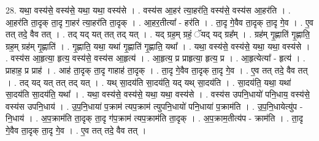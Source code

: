 \documentclass[17pt]{extarticle}
\begin{document}
28. यथा॒ वस्य॑से॒ वस्य॑से॒ यथा॒ यथा॒ वस्य॑से । . वस्य॑स आ॒हर॑ त्या॒हर॑ति॒ वस्य॑से॒ वस्य॑स आ॒हर॑ति । . आ॒हर॑ति ता॒दृक् ता॒दृ गा॒हर॑ त्या॒हर॑ति ता॒दृक् । . आ॒हर॒तीत्या᳚ - हर॑ति । . ता॒दृ गे॒वैव ता॒दृक् ता॒दृ गे॒व । . ए॒व तत् तदे॒ वैव तत् । . तद् यद् यत् तत् तद् यत् । . यद् ग्रह॒म् ग्रहं॒ ॅयद् यद् ग्रह᳚म् । . ग्रह॑म् गृ॒ह्णाति॑ गृ॒ह्णाति॒ ग्रह॒म् ग्रह॑म् गृ॒ह्णाति॑ । . गृ॒ह्णाति॒ यथा॒ यथा॑ गृ॒ह्णाति॑ गृ॒ह्णाति॒ यथा᳚ । . यथा॒ वस्य॑से॒ वस्य॑से॒ यथा॒ यथा॒ वस्य॑से । . वस्य॑स आ॒हृत्या॒ हृत्य॒ वस्य॑से॒ वस्य॑स आ॒हृत्य॑ । . आ॒हृत्य॒ प्र प्राहृत्या॒ हृत्य॒ प्र । . आ॒हृत्येत्या᳚ - हृत्य॑ । . प्राहाह॒ प्र प्राह॑ । . आह॑ ता॒दृक् ता॒दृ गाहाह॑ ता॒दृक् । . ता॒दृ गे॒वैव ता॒दृक् ता॒दृ गे॒व । . ए॒व तत् तदे॒ वैव तत् । . तद् यद् यत् तत् तद् यत् । . यथ् सा॒दय॑ति सा॒दय॑ति॒ यद् यथ् सा॒दय॑ति । . सा॒दय॑ति॒ यथा॒ यथा॑ सा॒दय॑ति सा॒दय॑ति॒ यथा᳚ । . यथा॒ वस्य॑से॒ वस्य॑से॒ यथा॒ यथा॒ वस्य॑से । . वस्य॑स उपनि॒धायो॑ पनि॒धाय॒ वस्य॑से॒ वस्य॑स उपनि॒धाय॑ । . उ॒प॒नि॒धाया॑ प॒क्राम॑ त्यप॒क्राम॑ त्युपनि॒धायो॑ पनि॒धाया॑ प॒क्राम॑ति । . उ॒प॒नि॒धायेत्यु॑प - नि॒धाय॑ । . अ॒प॒क्राम॑ति ता॒दृक् ता॒दृ ग॑प॒क्राम॑ त्यप॒क्राम॑ति ता॒दृक् । . अ॒प॒क्राम॒तीत्य॑प - क्राम॑ति । . ता॒दृ गे॒वैव ता॒दृक् ता॒दृ गे॒व । . ए॒व तत् तदे॒ वैव तत् । \newline
\end{document}
